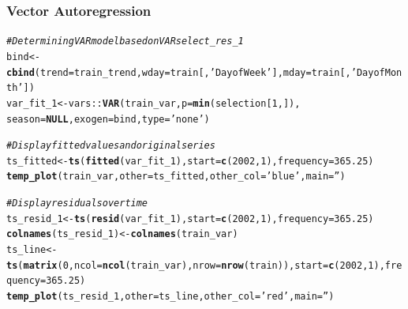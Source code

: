 \documentclass{article}\usepackage[]{graphicx}\usepackage[]{color}
\makeatletter
\newcommand{\hlnum}[1]{\textcolor[rgb]{0.686,0.059,0.569}{#1}}%
\newcommand{\hlstr}[1]{\textcolor[rgb]{0.192,0.494,0.8}{#1}}%
\newcommand{\hlcom}[1]{\textcolor[rgb]{0.678,0.584,0.686}{\textit{#1}}}%
\newcommand{\hlopt}[1]{\textcolor[rgb]{0,0,0}{#1}}%
\newcommand{\hlstd}[1]{\textcolor[rgb]{0.345,0.345,0.345}{#1}}%
\newcommand{\hlkwa}[1]{\textcolor[rgb]{0.161,0.373,0.58}{\textbf{#1}}}%
\newcommand{\hlkwb}[1]{\textcolor[rgb]{0.69,0.353,0.396}{#1}}%
\newcommand{\hlkwc}[1]{\textcolor[rgb]{0.333,0.667,0.333}{#1}}%
\newcommand{\hlkwd}[1]{\textcolor[rgb]{0.737,0.353,0.396}{\textbf{#1}}}%
\newenvironment{kframe}{%
 \def\at@end@of@kframe{}%
 \ifinner\ifhmode%
  \def\at@end@of@kframe{\end{minipage}}%
  \begin{minipage}{\columnwidth}%
 \fi\fi%
 \def\FrameCommand##1{\hskip\@totalleftmargin \hskip-\fboxsep
 \colorbox{shadecolor}{##1}\hskip-\fboxsep
     \hskip-\linewidth \hskip-\@totalleftmargin \hskip\columnwidth}%
 \MakeFramed {\advance\hsize-\width
   \@totalleftmargin\z@ \linewidth\hsize
   \@setminipage}}%
 {\par\unskip\endMakeFramed%
 \at@end@of@kframe}
\newenvironment{knitrout}{}{} %
\makeatother
\begin{document}
\subsubsection*{Vector Autoregression}
\begin{knitrout}
\color{fgcolor}\begin{kframe}
\begin{alltt}
\hlcom{# Determining VAR model based on VARselect_res_1}
\hlstd{bind} \hlkwb{<-} \hlkwd{cbind}\hlstd{(}\hlkwc{trend}\hlstd{=train_trend,} \hlkwc{wday}\hlstd{=train[,}\hlstr{'Day of Week'}\hlstd{],} \hlkwc{mday}\hlstd{=train[,}\hlstr{'Day of Month'}\hlstd{])}
\hlstd{var_fit_1} \hlkwb{<-} \hlstd{vars}\hlopt{::}\hlkwd{VAR}\hlstd{(train_var,} \hlkwc{p}\hlstd{=}\hlkwd{min}\hlstd{(selection[}\hlnum{1}\hlstd{,]),}
  \hlkwc{season}\hlstd{=}\hlkwa{NULL}\hlstd{,} \hlkwc{exogen}\hlstd{=bind,} \hlkwc{type}\hlstd{=}\hlstr{'none'}\hlstd{)}

\hlcom{# Display fitted values and original series}
\hlstd{ts_fitted} \hlkwb{<-} \hlkwd{ts}\hlstd{(}\hlkwd{fitted}\hlstd{(var_fit_1),} \hlkwc{start}\hlstd{=}\hlkwd{c}\hlstd{(}\hlnum{2002}\hlstd{,} \hlnum{1}\hlstd{),} \hlkwc{frequency}\hlstd{=}\hlnum{365.25}\hlstd{)}
\hlkwd{temp_plot}\hlstd{(train_var,} \hlkwc{other}\hlstd{=ts_fitted,} \hlkwc{other_col}\hlstd{=}\hlstr{'blue'}\hlstd{,} \hlkwc{main}\hlstd{=}\hlstr{''}\hlstd{)}

\hlcom{# Display residuals over time}
\hlstd{ts_resid_1} \hlkwb{<-} \hlkwd{ts}\hlstd{(}\hlkwd{resid}\hlstd{(var_fit_1),} \hlkwc{start}\hlstd{=}\hlkwd{c}\hlstd{(}\hlnum{2002}\hlstd{,} \hlnum{1}\hlstd{),} \hlkwc{frequency}\hlstd{=}\hlnum{365.25}\hlstd{)}
\hlkwd{colnames}\hlstd{(ts_resid_1)} \hlkwb{<-} \hlkwd{colnames}\hlstd{(train_var)}
\hlstd{ts_line} \hlkwb{<-} \hlkwd{ts}\hlstd{(}\hlkwd{matrix}\hlstd{(}\hlnum{0}\hlstd{,} \hlkwc{ncol}\hlstd{=}\hlkwd{ncol}\hlstd{(train_var),} \hlkwc{nrow}\hlstd{=}\hlkwd{nrow}\hlstd{(train)),} \hlkwc{start}\hlstd{=}\hlkwd{c}\hlstd{(}\hlnum{2002}\hlstd{,}\hlnum{1}\hlstd{),} \hlkwc{frequency}\hlstd{=}\hlnum{365.25}\hlstd{)}
\hlkwd{temp_plot}\hlstd{(ts_resid_1,} \hlkwc{other}\hlstd{=ts_line,} \hlkwc{other_col}\hlstd{=}\hlstr{'red'}\hlstd{,} \hlkwc{main}\hlstd{=}\hlstr{''}\hlstd{)}
\end{alltt}
\end{kframe}
\end{knitrout}
\end{document}
